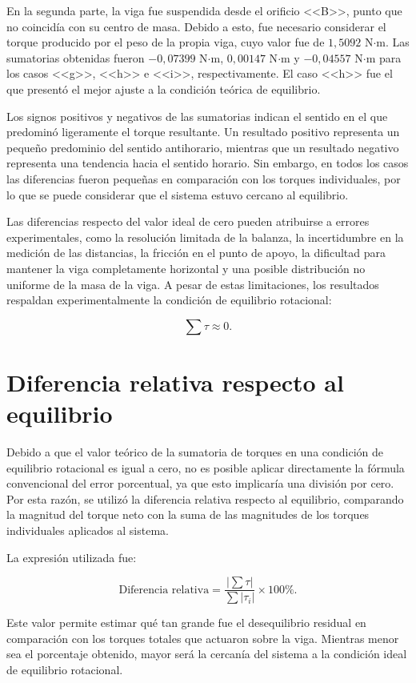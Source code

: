 En la segunda parte, la viga fue suspendida desde el orificio <<B>>, punto que no coincidía con su centro de masa. Debido a esto, fue necesario considerar el torque producido por el peso de la propia viga, cuyo valor fue de $1{,}5092$ N$\cdot$m. Las sumatorias obtenidas fueron $-0{,}07399$ N$\cdot$m, $0{,}00147$ N$\cdot$m y $-0{,}04557$ N$\cdot$m para los casos <<g>>, <<h>> e <<i>>, respectivamente. El caso <<h>> fue el que presentó el mejor ajuste a la condición teórica de equilibrio.

Los signos positivos y negativos de las sumatorias indican el sentido en el que predominó ligeramente el torque resultante. Un resultado positivo representa un pequeño predominio del sentido antihorario, mientras que un resultado negativo representa una tendencia hacia el sentido horario. Sin embargo, en todos los casos las diferencias fueron pequeñas en comparación con los torques individuales, por lo que se puede considerar que el sistema estuvo cercano al equilibrio.

Las diferencias respecto del valor ideal de cero pueden atribuirse a errores experimentales, como la resolución limitada de la balanza, la incertidumbre en la medición de las distancias, la fricción en el punto de apoyo, la dificultad para mantener la viga completamente horizontal y una posible distribución no uniforme de la masa de la viga. A pesar de estas limitaciones, los resultados respaldan experimentalmente la condición de equilibrio rotacional:

\[\sum \tau \approx 0.\]

\newpage

\section{Diferencia relativa respecto al equilibrio}


Debido a que el valor teórico de la sumatoria de torques en una condición de equilibrio rotacional es igual a cero, no es posible aplicar directamente la fórmula convencional del error porcentual, ya que esto implicaría una división por cero. Por esta razón, se utilizó la diferencia relativa respecto al equilibrio, comparando la magnitud del torque neto con la suma de las magnitudes de los torques individuales aplicados al sistema.

La expresión utilizada fue:

\[
\text{Diferencia relativa} =
\frac{\left|\sum \tau\right|}
{\sum |\tau_i|}
\times 100\%.
\]

Este valor permite estimar qué tan grande fue el desequilibrio residual en comparación con los torques totales que actuaron sobre la viga. Mientras menor sea el porcentaje obtenido, mayor será la cercanía del sistema a la condición ideal de equilibrio rotacional.

